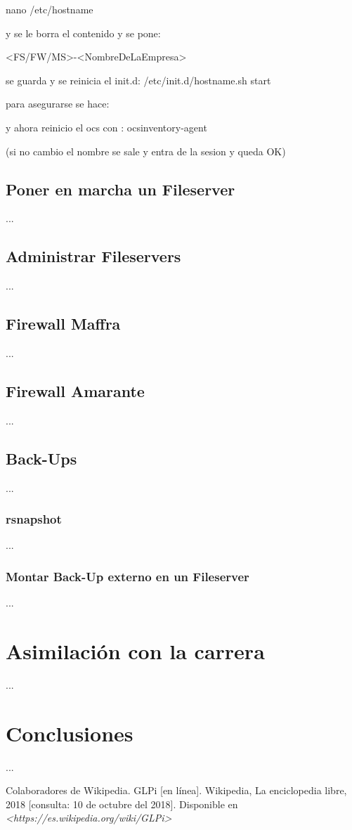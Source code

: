 \documentclass[12pt,a4paper]{article}
\begin{document}
nano /etc/hostname

y se le borra el contenido y se pone:

<FS/FW/MS>-<NombreDeLaEmpresa>

se guarda y se reinicia el init.d:
/etc/init.d/hostname.sh start

para asegurarse se hace:


y ahora reinicio el ocs con :
ocsinventory-agent 

(si no cambio el nombre se sale y entra de la sesion y queda OK)

\subsection{Poner en marcha un Fileserver}
...

\subsection{Administrar Fileservers} %
...

\subsection{Firewall Maffra}
...

\subsection{Firewall Amarante} %
...

\subsection{Back-Ups} 
...

\subsubsection{rsnapshot} %
...

\subsubsection{Montar Back-Up externo en un Fileserver}
...

\section{Asimilación con la carrera}
...

\section{Conclusiones}
...

\begin{thebibliography}{9}
Colaboradores de Wikipedia. GLPi [en línea]. Wikipedia, La enciclopedia libre, 2018 [consulta: 10 de octubre del 2018]. Disponible en \textit{<https://es.wikipedia.org/wiki/GLPi>}
\end{thebibliography}
\end{document}
